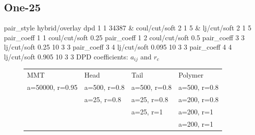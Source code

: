 \documentclass[a4paper]{article}
\begin{document}
\subsection*{One-25}
pair\_style hybrid/overlay dpd 1 1 34387 \& coul/cut/soft 2 1 5 \& 
lj/cut/soft 2 1 5\newline
pair\_coeff 1 1 coul/cut/soft 0.25
pair\_coeff 1 2 coul/cut/soft 0.5\newline
pair\_coeff 3 3 lj/cut/soft 0.25   10 3 3\newline
pair\_coeff 3 4 lj/cut/soft 0.095  10 3 3\newline
pair\_coeff 4 4 lj/cut/soft 0.905  10 3 3\newline
DPD coefficients: $a_{ij}$ and $r_c$
\begin{figure}[H]\begin{tabular}{llll}
MMT             & Head         & Tail         & Polymer      \\
a=50000, r=0.95 & a=500, r=0.8 & a=500, r=0.8 & a=500, r=0.8 \\
                & a=25,  r=0.8 & a=25,  r=0.8 & a=200, r=0.8 \\
                &              & a=25,  r=1   & a=200, r=1   \\
                &              &              & a=200, r=1   \\
\end{tabular}\end{figure}
\end{document}
